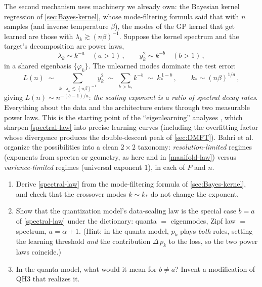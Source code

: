 \documentclass[11pt]{article}
\begin{document}
The second mechanism uses machinery we already own: the Bayesian kernel regression of \cref{sec:Bayes-kernel}, whose mode-filtering formula said that with $n$ samples (and inverse temperature $\beta$), the modes of the GP kernel that get learned are those with $\lambda_k \gtrsim (n\beta)^{-1}$. Suppose the kernel spectrum and the target's decomposition are power laws,
%
\begin{equation}
    \lambda_k \sim k^{-a}\quad (a>1)\,,\qquad y_k^2 \sim k^{-b}\quad (b>1)\,,
\end{equation}
%
in a shared eigenbasis $\{\varphi_k\}$. The unlearned modes dominate the test error:
%
\begin{equation} \label{spectral-law}
    L(n) \;\sim\; \sum_{k \,:\, \lambda_k \lesssim (n\beta)^{-1}} y_k^2
    \;\sim\; \sum_{k > k_*} k^{-b}
    \;\sim\; k_*^{\,1-b}\,,\qquad k_* \sim (n\beta)^{1/a}\,,
\end{equation}
%
giving $L(n) \sim n^{-(b-1)/a}$: \emph{the scaling exponent is a ratio of spectral decay rates}. Everything about the data and the architecture enters through two measurable power laws. This is the starting point of the ``eigenlearning'' analyses \cite{bordelon2020spectrum,canatar2021spectral,simon2023eigenlearning}, which sharpen \eqref{spectral-law} into precise learning curves (including the overfitting factor whose divergence produces the double-descent peak of \cref{sec:DMFT}). Bahri et al.\ \cite{bahri2021explaining} organize the possibilities into a clean $2\times2$ taxonomy: \emph{resolution-limited} regimes (exponents from spectra or geometry, as here and in \eqref{manifold-law}) versus \emph{variance-limited} regimes (universal exponent $1$), in each of $P$ and $n$.

\begin{exercise}
\label{ex:spectra}
\begin{enumerate}
  \item Derive \eqref{spectral-law} from the mode-filtering formula of \cref{sec:Bayes-kernel}, and check that the crossover modes $k\sim k_*$ do not change the exponent.
  \item Show that the quantization model's data-scaling law is the special case $b=a$ of \eqref{spectral-law} under the dictionary: quanta $=$ eigenmodes, Zipf law $=$ spectrum, $a = \alpha+1$. (Hint: in the quanta model, $p_k$ plays \emph{both} roles, setting the learning threshold \emph{and} the contribution $\Delta\,p_k$ to the loss, so the two power laws coincide.)
  \item In the quanta model, what would it mean for $b \neq a$? Invent a modification of QH3 that realizes it.
\end{enumerate}
\end{exercise}
\end{document}
